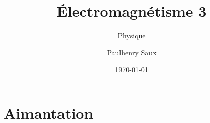 \documentclass[french]{yLectureNote}
\title{Électromagnétisme 3}
\subtitle{Physique}
\author{Paulhenry Saux}
\date{\today}
\renewcommand{\vec}{\overrightarrow}
\newcommand{\dd}{\mathrm{d}}
\begin{document}
\chapter{Aimantation}



\end{document}
